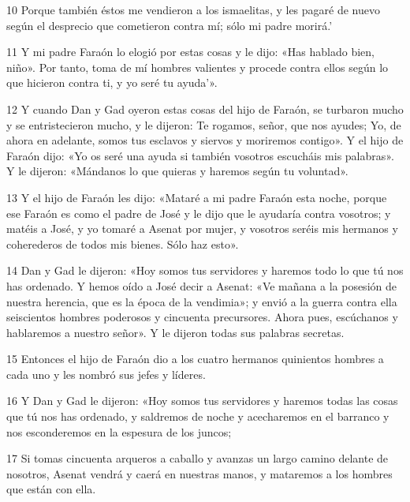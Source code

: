 \par 10 Porque también éstos me vendieron a los ismaelitas, y les pagaré de nuevo según el desprecio que cometieron contra mí; sólo mi padre morirá.'

\par 11 Y mi padre Faraón lo elogió por estas cosas y le dijo: «Has hablado bien, niño». Por tanto, toma de mí hombres valientes y procede contra ellos según lo que hicieron contra ti, y yo seré tu ayuda'».

\par 12 Y cuando Dan y Gad oyeron estas cosas del hijo de Faraón, se turbaron mucho y se entristecieron mucho, y le dijeron: Te rogamos, señor, que nos ayudes; Yo, de ahora en adelante, somos tus esclavos y siervos y moriremos contigo». Y el hijo de Faraón dijo: «Yo os seré una ayuda si también vosotros escucháis mis palabras». Y le dijeron: «Mándanos lo que quieras y haremos según tu voluntad».

\par 13 Y el hijo de Faraón les dijo: «Mataré a mi padre Faraón esta noche, porque ese Faraón es como el padre de José y le dijo que le ayudaría contra vosotros; y matéis a José, y yo tomaré a Asenat por mujer, y vosotros seréis mis hermanos y coherederos de todos mis bienes. Sólo haz esto».

\par 14 Dan y Gad le dijeron: «Hoy somos tus servidores y haremos todo lo que tú nos has ordenado. Y hemos oído a José decir a Asenat: «Ve mañana a la posesión de nuestra herencia, que es la época de la vendimia»; y envió a la guerra contra ella seiscientos hombres poderosos y cincuenta precursores. Ahora pues, escúchanos y hablaremos a nuestro señor». Y le dijeron todas sus palabras secretas.

\par 15 Entonces el hijo de Faraón dio a los cuatro hermanos quinientos hombres a cada uno y les nombró sus jefes y líderes.

\par 16 Y Dan y Gad le dijeron: «Hoy somos tus servidores y haremos todas las cosas que tú nos has ordenado, y saldremos de noche y acecharemos en el barranco y nos esconderemos en la espesura de los juncos;

\par 17 Si tomas cincuenta arqueros a caballo y avanzas un largo camino delante de nosotros, Asenat vendrá y caerá en nuestras manos, y mataremos a los hombres que están con ella.

